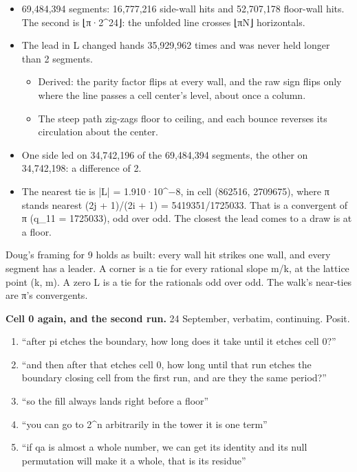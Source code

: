 \begin{itemize}
\item 69,484,394 segments: 16,777,216 side-wall hits and 52,707,178 floor-wall hits. The second is ⌊π·2\textasciicircum{}24⌋: the unfolded line crosses ⌊πN⌋ horizontals.
\item The lead in L changed hands 35,929,962 times and was never held longer than 2 segments.

\begin{itemize}
\item Derived: the parity factor flips at every wall, and the raw sign flips only where the line passes a cell center's level, about once a column.
\item The steep path zig-zags floor to ceiling, and each bounce reverses its circulation about the center.
\end{itemize}
\item One side led on 34,742,196 of the 69,484,394 segments, the other on 34,742,198: a difference of 2.
\item The nearest tie is |L| = 1.910·10\textasciicircum{}−8, in cell (862516, 2709675), where π stands nearest (2j + 1)/(2i + 1) = 5419351/1725033. That is a convergent of π (q\_\allowbreak{}11 = 1725033), odd over odd. The closest the lead comes to a draw is at a floor.
\end{itemize}

Doug's framing for 9 holds as built: every wall hit strikes one wall, and every segment has a leader. A corner is a tie for every rational slope m/k, at the lattice point (k, m). A zero L is a tie for the rationals odd over odd. The walk's near-ties are π's convergents.

\textbf{Cell 0 again, and the second run.} 24 September, verbatim, continuing. Posit.

\begin{enumerate}
\item “after pi etches the boundary, how long does it take until it etches cell 0?”
\item “and then after that etches cell 0, how long until that run etches the boundary closing cell from the first run, and are they the same period?”
\item “so the fill always lands right before a floor”
\item “you can go to 2\textasciicircum{}n arbitrarily in the tower it is one term”
\item “if qa is almost a whole number, we can get its identity and its null permutation will make it a whole, that is its residue”
\end{enumerate}

